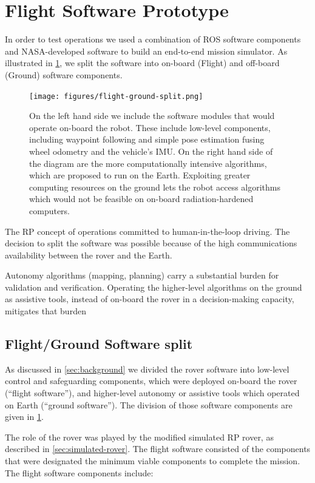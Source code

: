 \documentclass[twocolumn,letterpaper]{IEEEAerospaceCLS}  %
\begin{document}
\section{Flight Software Prototype}

In order to test operations we used a combination of ROS software components and NASA-developed software to build an end-to-end mission simulator.  As illustrated in \cref{fig:rp-software}, we split the software into on-board (Flight) and off-board (Ground) software components.  

\begin{figure}
\centering
\texttt{[image: figures/flight-ground-split.png]}
\caption{On the left hand side we include the software modules that would operate on-board the robot.  These include low-level components, including waypoint following and simple pose estimation fusing wheel odometry and the vehicle's IMU.  
On the right hand side of the diagram are the more computationally intensive algorithms, which are proposed to run on the Earth.  Exploiting greater computing resources on the ground lets the robot access algorithms which would not be feasible on on-board radiation-hardened computers. \label{fig:rp-software}}
\end{figure}

The RP concept of operations committed to human-in-the-loop driving.  The decision to split the software was possible because of the high communications availability between the rover and the Earth.  

Autonomy algorithms (mapping, planning) carry a substantial burden for validation and verification. Operating the higher-level algorithms on the ground as assistive tools, instead of on-board the rover in a decision-making capacity, mitigates that burden


\subsection{Flight/Ground Software split}

As discussed in \cref{sec:background} we divided the rover software into low-level control and safeguarding components, which were deployed on-board the rover (``flight software''), and higher-level autonomy or assistive tools which operated on Earth (``ground software'').  
The division of those software components are given in \cref{fig:rp-software}.   

The role of the rover was played by the modified simulated RP rover, as described in \cref{sec:simulated-rover}.  The flight software consisted of the components that were designated the minimum viable components to complete the mission.  The flight software components include:
\end{document}
